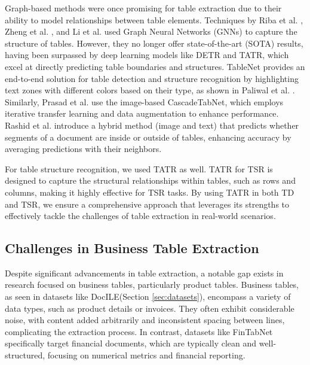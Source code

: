 Graph-based methods were once promising for table extraction due to their ability to model relationships between table elements. Techniques by Riba et al. \cite{Riba2019TableDI}, Zheng et al. \cite{Zheng2020GlobalTE}, and Li et al. \cite{Li2022TableSR} used Graph Neural Networks (GNNs) to capture the structure of tables. However, they no longer offer state-of-the-art (SOTA) results, having been surpassed by deep learning models like DETR and TATR, which excel at directly predicting table boundaries and structures. TableNet provides an end-to-end solution for table detection and structure recognition by highlighting text zones with different colors based on their type, as shown in Paliwal et al. \cite{Paliwal2019TableNetDL}. Similarly, Prasad et al. \cite{Prasad2020CascadeTabNetAA} use the image-based CascadeTabNet, which employs iterative transfer learning and data augmentation to enhance performance. Rashid et al. \cite{Rashid2017TableRI} introduce a hybrid method (image and text) that predicts whether segments of a document are inside or outside of tables, enhancing accuracy by averaging predictions with their neighbors.

For table structure recognition, we used TATR \cite{Smock2021PubTables1MTC} as well. TATR for TSR is designed to capture the structural relationships within tables, such as rows and columns, making it highly effective for TSR tasks. By using TATR in both TD and TSR, we ensure a comprehensive approach that leverages its strengths to effectively tackle the challenges of table extraction in real-world scenarios.

\subsection{Challenges in Business Table Extraction}


Despite significant advancements in table extraction, a notable gap exists in research focused on business tables, particularly product tables. Business tables, as seen in datasets like DocILE\cite{vSimsa2023DocILEBF}(Section \ref{sec:datasets}), encompass a variety of data types, such as product details or invoices. They often exhibit considerable noise, with content added arbitrarily and inconsistent spacing between lines, complicating the extraction process. In contrast, datasets like FinTabNet \cite{Zheng2020GlobalTE} specifically target financial documents, which are typically clean and well-structured, focusing on numerical metrics and financial reporting. 

